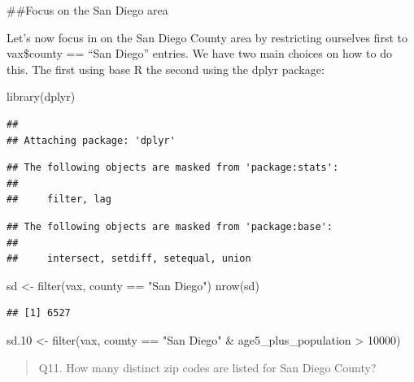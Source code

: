 \documentclass[
]{article}
\newenvironment{Shaded}{\begin{snugshade}}{\end{snugshade}}
\newcommand{\DecValTok}[1]{\textcolor[rgb]{0.00,0.00,0.81}{#1}}
\newcommand{\FloatTok}[1]{\textcolor[rgb]{0.00,0.00,0.81}{#1}}
\newcommand{\FunctionTok}[1]{\textcolor[rgb]{0.00,0.00,0.00}{#1}}
\newcommand{\NormalTok}[1]{#1}
\newcommand{\OtherTok}[1]{\textcolor[rgb]{0.56,0.35,0.01}{#1}}
\newcommand{\SpecialCharTok}[1]{\textcolor[rgb]{0.00,0.00,0.00}{#1}}
\newcommand{\StringTok}[1]{\textcolor[rgb]{0.31,0.60,0.02}{#1}}
\begin{document}
\#\#Focus on the San Diego area

Let's now focus in on the San Diego County area by restricting ourselves
first to vax\$county == ``San Diego'' entries. We have two main choices
on how to do this. The first using base R the second using the dplyr
package:

\begin{Shaded}
\begin{Highlighting}[]
\FunctionTok{library}\NormalTok{(dplyr)}
\end{Highlighting}
\end{Shaded}

\begin{verbatim}
## 
## Attaching package: 'dplyr'
\end{verbatim}

\begin{verbatim}
## The following objects are masked from 'package:stats':
## 
##     filter, lag
\end{verbatim}

\begin{verbatim}
## The following objects are masked from 'package:base':
## 
##     intersect, setdiff, setequal, union
\end{verbatim}

\begin{Shaded}
\begin{Highlighting}[]
\NormalTok{sd }\OtherTok{\textless{}{-}} \FunctionTok{filter}\NormalTok{(vax, county }\SpecialCharTok{==} \StringTok{"San Diego"}\NormalTok{)}
\FunctionTok{nrow}\NormalTok{(sd)}
\end{Highlighting}
\end{Shaded}

\begin{verbatim}
## [1] 6527
\end{verbatim}

\begin{Shaded}
\begin{Highlighting}[]
\NormalTok{sd}\FloatTok{.10} \OtherTok{\textless{}{-}} \FunctionTok{filter}\NormalTok{(vax, county }\SpecialCharTok{==} \StringTok{"San Diego"} \SpecialCharTok{\&}
\NormalTok{                age5\_plus\_population }\SpecialCharTok{\textgreater{}} \DecValTok{10000}\NormalTok{)}
\end{Highlighting}
\end{Shaded}

\begin{quote}
Q11. How many distinct zip codes are listed for San Diego County?
\end{quote}
\end{document}
